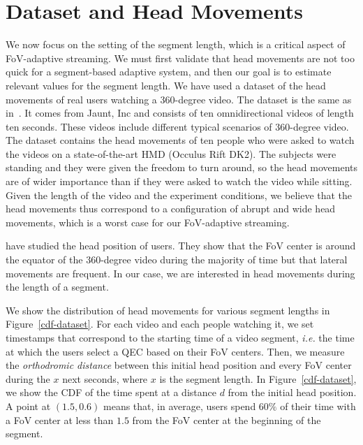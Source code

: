 \section{Dataset and Head Movements}
\label{sec:dataset}

We now focus on the setting of the segment length, which is a critical aspect of FoV-adaptive streaming.
We must first validate that head movements are not too quick for a segment-based 
adaptive system, and then our goal is to 
estimate relevant values for the segment length. 
We have used a dataset of the head movements of real users watching
a 360-degree video. The dataset is the same as in~\cite{yu_framework_2015}. It comes from
Jaunt, Inc and consists of ten omnidirectional videos of length ten seconds. These videos include
different typical scenarios of 360-degree video. The dataset contains the head movements of
ten people who were asked to watch the videos on a state-of-the-art \ac{HMD} (Occulus Rift DK2).
The subjects were standing and they were given the freedom to turn around, so the head movements
are of wider importance than if they were asked to watch the video while sitting. Given the length of
the video and the experiment conditions, we believe that the head movements thus correspond to 
a configuration of abrupt and wide head movements, which is a worst case for our FoV-adaptive streaming.

\citet{yu_framework_2015} have studied the head position of users. They show that the 
FoV center is around the equator of the 360-degree video
during the majority of time but that lateral movements are frequent. In our case, we are interested in head
movements during the length of a segment.

We show the distribution of head movements for various segment lengths in Figure~\ref{cdf-dataset}. 
For each video
and each people watching it, we set timestamps that correspond to the starting time of a video segment,
\textit{i.e.} the time at which the users select a QEC based on their FoV centers.
Then, we measure the \emph{orthodromic distance} between this initial head position and every FoV center
during the $x$ next seconds, where $x$ is the segment length. In Figure~\ref{cdf-dataset}, we show the \ac{CDF} of the time spent at a distance
$d$ from the initial head position. A point at $(1.5,0.6)$ means that, in average, users spend $60\%$ of
their time with a FoV center at less than $1.5$ from the FoV center at the beginning of the segment.

